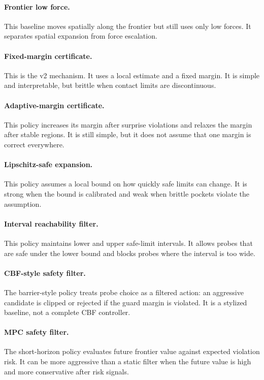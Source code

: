 \documentclass{article}
\begin{document}
\paragraph{Frontier low force.}
This baseline moves spatially along the frontier but still uses only low
forces. It separates spatial expansion from force escalation.

\paragraph{Fixed-margin certificate.}
This is the v2 mechanism. It uses a local estimate and a fixed margin. It is
simple and interpretable, but brittle when contact limits are discontinuous.

\paragraph{Adaptive-margin certificate.}
This policy increases its margin after surprise violations and relaxes the
margin after stable regions. It is still simple, but it does not assume that
one margin is correct everywhere.

\paragraph{Lipschitz-safe expansion.}
This policy assumes a local bound on how quickly safe limits can change. It is
strong when the bound is calibrated and weak when brittle pockets violate the
assumption.

\paragraph{Interval reachability filter.}
This policy maintains lower and upper safe-limit intervals. It allows probes
that are safe under the lower bound and blocks probes where the interval is too
wide.

\paragraph{CBF-style safety filter.}
The barrier-style policy treats probe choice as a filtered action: an
aggressive candidate is clipped or rejected if the guard margin is violated.
It is a stylized baseline, not a complete CBF controller.

\paragraph{MPC safety filter.}
The short-horizon policy evaluates future frontier value against expected
violation risk. It can be more aggressive than a static filter when the future
value is high and more conservative after risk signals.
\end{document}
